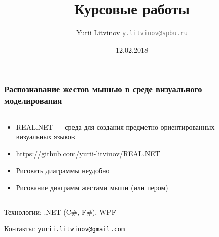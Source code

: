 \documentclass[xetex,mathserif,serif]{beamer}
\title{Курсовые работы}
\author[Юрий Литвинов]{Yurii Litvinov \newline 
	\textcolor{gray}{\small\texttt{y.litvinov@spbu.ru}}
}
\date{12.02.2018}
\begin{document}
	
	\begin{frame}
		\frametitle{Распознавание жестов мышью в среде визуального моделирования}
		\begin{columns}
			\begin{column}{0.5\textwidth}
				\begin{itemize}
					\item REAL.NET --- среда для создания предметно-ориентированных визуальных языков
					\item \url{https://github.com/yurii-litvinov/REAL.NET}
					\item Рисовать диаграммы неудобно
					\item Рисование диаграмм жестами мыши (или пером)
				\end{itemize}
			\end{column}
			\begin{column}{0.5\textwidth}

			\end{column}
		\end{columns}
		Технологии: .NET (C\#, F\#), WPF

		Контакты: \texttt{yurii.litvinov@gmail.com}
	\end{frame}
\end{document}
